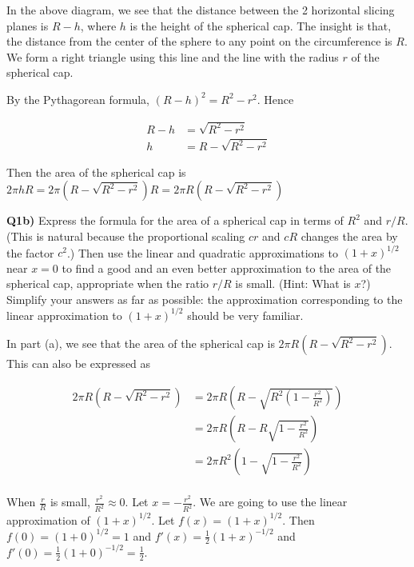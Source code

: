 \documentclass[9pt]{article}
\begin{document}
In the above diagram, we see that the distance between the 2 horizontal slicing planes is $R - h$, where $h$ is the height of the spherical cap. The insight is that, the distance from the center of the sphere to any point on the circumference is $R$. We form a right triangle using this line and the line with the radius $r$ of the spherical cap.

By the Pythagorean formula, $(R - h)^2 = R^2 - r^2$. Hence

\begin{align*}
  R - h &= \sqrt{R^2 - r^2}\\
  h &= R - \sqrt{R^2 - r^2}
\end{align*}

Then the area of the spherical cap is $2 \pi h R = 2 \pi (R - \sqrt{R^2 - r^2}) R = 2 \pi R (R - \sqrt{R^2 - r^2})$


\begin{tcolorbox}
  \textbf{Q1b)} Express the formula for the area of a spherical cap in terms of $R^2$ and $r / R$. (This is natural because the proportional scaling $cr$ and $cR$ changes the area by the factor $c^2$.) Then use the linear and quadratic approximations to $(1 + x)^{1/2}$ near $x = 0$ to find a good and an even better approximation to the area of the spherical cap, appropriate when the ratio $r / R$ is small. (Hint: What is $x$?) Simplify your answers as far as possible: the approximation corresponding to the linear approximation to $(1 + x)^{1/2}$ should be very familiar.
\end{tcolorbox}

In part (a), we see that the area of the spherical cap is $2 \pi R (R - \sqrt{R^2 - r^2})$. This can also be expressed as

\begin{align*}
  2 \pi R (R - \sqrt{R^2 - r^2}) &= 2 \pi R (R - \sqrt{R^2 (1 - \frac{r^2}{R^2})}) \\
                                 &= 2 \pi R (R - R \sqrt{1 - \frac{r^2}{R^2}}) \\
                                 &= 2 \pi R^2 (1 - \sqrt{1 - \frac{r^2}{R^2}}) \\
\end{align*}

When $\frac{r}{R}$ is small, $\frac{r^2}{R^2} \approx 0$. Let $x = -\frac{r^2}{R^2}$. We are going to use the linear approximation of $(1 + x)^{1/2}$. Let $f(x) = (1 + x)^{1/2}$. Then $f(0) = (1 + 0)^{1/2} = 1$ and $f'(x) = \frac{1}{2} (1 + x)^{-1/2}$ and $f'(0) = \frac{1}{2}(1 + 0)^{-1/2} = \frac{1}{2}$.
\end{document}
